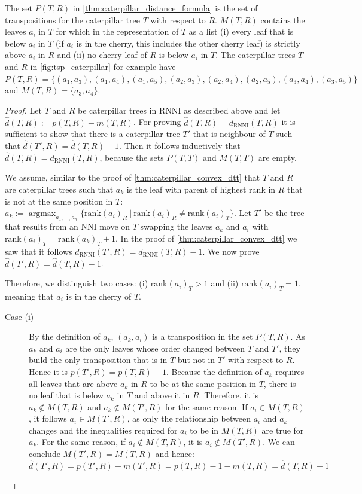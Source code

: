 \documentclass[11pt]{amsart}
\newcommand{\rnni}{\mathrm{RNNI}}
\newcommand{\rank}{\mathrm{rank}}
\newcommand{\nni}{\mathrm{NNI}}
\DeclareMathOperator*{\argmax}{argmax}
\begin{document}
The set $P(T,R)$ in \autoref{thm:caterpillar_distance_formula} is the set of transpositions for the caterpillar tree $T$ with respect to $R$.
$M(T,R)$ contains the leaves $a_i$ in $T$ for which in the representation of $T$ as a list (i) every leaf that is below $a_i$ in $T$ (if $a_i$ is in the cherry, this includes the other cherry leaf) is strictly above $a_i$ in $R$ and (ii) no cherry leaf of $R$ is below $a_i$ in $T$.
The caterpillar trees $T$ and $R$ in \autoref{fig:tsp_caterpillar} for example have $P(T,R) = \{(a_1,a_3),(a_1,a_4),(a_1,a_5),(a_2,a_3),(a_2,a_4),(a_2,a_5),(a_3,a_4),(a_3,a_5)\}$ and $M(T,R) = \{a_3,a_4\}$.

\begin{proof}
	Let $T$ and $R$ be caterpillar trees in $\rnni$ as described above and let $\widehat d(T,R) := p(T,R) - m(T,R)$.
	For proving $\widehat d(T,R) = d_{\rnni}(T,R)$ it is sufficient to show that there is a caterpillar tree $T'$ that is neighbour of $T$ such that $\widehat d(T',R) = \widehat d(T,R) - 1$.
	Then it follows inductively that $\widehat d(T,R) = d_{\rnni}(T,R)$, because the sets $P(T,T)$ and $M(T,T)$ are empty.

	We assume, similar to the proof of \autoref{thm:caterpillar_convex_dtt} that $T$ and $R$ are caterpillar trees such that $a_k$ is the leaf with parent of highest rank in $R$ that is not at the same position in $T$:
	$a_k := \argmax_{a_1, \ldots, a_n}\{\rank(a_i)_{R} \ |\  \rank(a_i)_{R} \neq \rank(a_i)_{T}\}$.
	Let $T'$ be the tree that results from an $\nni$ move on $T$ swapping the leaves $a_k$ and $a_i$ with $\rank(a_i)_T = \rank(a_k)_T + 1$.
	In the proof of \autoref{thm:caterpillar_convex_dtt} we saw that it follows $d_{\rnni}(T',R) = d_{\rnni}(T,R) - 1$.	
	We now prove $\widehat d(T',R) = \widehat d(T,R) - 1$.

	Therefore, we distinguish two cases: (i) $\rank(a_i)_T>1$ and (ii) $\rank(a_i)_T = 1$, meaning that $a_i$ is in the cherry of $T$.

	\begin{description}
		\item[Case (i)]
			By the definition of $a_k$, $(a_k,a_i)$ is a transposition in the set $P(T,R)$.
			As $a_k$ and $a_i$ are the only leaves whose order changed between $T$ and $T'$, they build the only transposition that is in $T$ but not in $T'$ with respect to $R$.
			Hence it is $p(T',R) = p(T,R) - 1$.
			Because the definition of $a_k$ requires all leaves that are above $a_k$ in $R$ to be at the same position in $T$, there is no leaf that is below $a_k$ in $T$ and above it in $R$.
			Therefore, it is $a_k \notin M(T,R)$ and $a_k \notin M(T',R)$ for the same reason.
			If $a_i \in M(T,R)$, it follows $a_i \in M(T',R)$, as only the relationship between $a_i$ and $a_k$ changes and the inequalities required for $a_i$ to be in $M(T,R)$ are true for $a_k$.
			For the same reason, if $a_i \notin M(T,R)$, it is $a_i \notin M(T',R)$.
			We can conclude $M(T',R) = M(T,R)$ and hence:
			\[\widehat d(T',R) = p(T',R) - m(T',R) = p(T,R) - 1 - m(T,R) = \widehat d(T,R) - 1\]


\end{description}
\end{proof}
\end{document}
